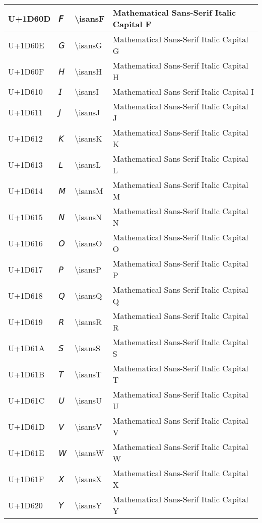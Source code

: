 \begin{table}[h]
\begin{tabulary}{\linewidth}{|L|L|L|L|}
\hline
U+1D60D & 𝘍 & {\textbackslash}isansF & Mathematical Sans-Serif Italic Capital F \\
\hline
U+1D60E & 𝘎 & {\textbackslash}isansG & Mathematical Sans-Serif Italic Capital G \\
\hline
U+1D60F & 𝘏 & {\textbackslash}isansH & Mathematical Sans-Serif Italic Capital H \\
\hline
U+1D610 & 𝘐 & {\textbackslash}isansI & Mathematical Sans-Serif Italic Capital I \\
\hline
U+1D611 & 𝘑 & {\textbackslash}isansJ & Mathematical Sans-Serif Italic Capital J \\
\hline
U+1D612 & 𝘒 & {\textbackslash}isansK & Mathematical Sans-Serif Italic Capital K \\
\hline
U+1D613 & 𝘓 & {\textbackslash}isansL & Mathematical Sans-Serif Italic Capital L \\
\hline
U+1D614 & 𝘔 & {\textbackslash}isansM & Mathematical Sans-Serif Italic Capital M \\
\hline
U+1D615 & 𝘕 & {\textbackslash}isansN & Mathematical Sans-Serif Italic Capital N \\
\hline
U+1D616 & 𝘖 & {\textbackslash}isansO & Mathematical Sans-Serif Italic Capital O \\
\hline
U+1D617 & 𝘗 & {\textbackslash}isansP & Mathematical Sans-Serif Italic Capital P \\
\hline
U+1D618 & 𝘘 & {\textbackslash}isansQ & Mathematical Sans-Serif Italic Capital Q \\
\hline
U+1D619 & 𝘙 & {\textbackslash}isansR & Mathematical Sans-Serif Italic Capital R \\
\hline
U+1D61A & 𝘚 & {\textbackslash}isansS & Mathematical Sans-Serif Italic Capital S \\
\hline
U+1D61B & 𝘛 & {\textbackslash}isansT & Mathematical Sans-Serif Italic Capital T \\
\hline
U+1D61C & 𝘜 & {\textbackslash}isansU & Mathematical Sans-Serif Italic Capital U \\
\hline
U+1D61D & 𝘝 & {\textbackslash}isansV & Mathematical Sans-Serif Italic Capital V \\
\hline
U+1D61E & 𝘞 & {\textbackslash}isansW & Mathematical Sans-Serif Italic Capital W \\
\hline
U+1D61F & 𝘟 & {\textbackslash}isansX & Mathematical Sans-Serif Italic Capital X \\
\hline
U+1D620 & 𝘠 & {\textbackslash}isansY & Mathematical Sans-Serif Italic Capital Y \\

\end{tabulary}
\end{table}
